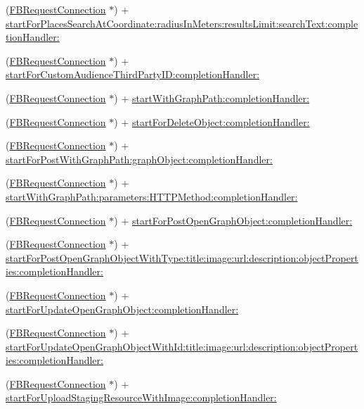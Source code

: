 \begin{DoxyCompactItemize}
\item 
(\hyperlink{interfaceFBRequestConnection}{F\+B\+Request\+Connection} $\ast$) + \hyperlink{interfaceFBRequestConnection_abc6f5878bcfabf0b419347a4cbfb2f68}{start\+For\+Places\+Search\+At\+Coordinate\+:radius\+In\+Meters\+:results\+Limit\+:search\+Text\+:completion\+Handler\+:}
\item 
(\hyperlink{interfaceFBRequestConnection}{F\+B\+Request\+Connection} $\ast$) + \hyperlink{interfaceFBRequestConnection_ab2ed1b7d417b4c723b37512870a5add9}{start\+For\+Custom\+Audience\+Third\+Party\+I\+D\+:completion\+Handler\+:}
\item 
(\hyperlink{interfaceFBRequestConnection}{F\+B\+Request\+Connection} $\ast$) + \hyperlink{interfaceFBRequestConnection_ad5b57e64c614dcb04a71e62ee11a87d5}{start\+With\+Graph\+Path\+:completion\+Handler\+:}
\item 
(\hyperlink{interfaceFBRequestConnection}{F\+B\+Request\+Connection} $\ast$) + \hyperlink{interfaceFBRequestConnection_a3fc3ae420d8e47fd0b7a6b915622c527}{start\+For\+Delete\+Object\+:completion\+Handler\+:}
\item 
(\hyperlink{interfaceFBRequestConnection}{F\+B\+Request\+Connection} $\ast$) + \hyperlink{interfaceFBRequestConnection_ac79fe3711cf5a9dd8a9dde04638ca255}{start\+For\+Post\+With\+Graph\+Path\+:graph\+Object\+:completion\+Handler\+:}
\item 
(\hyperlink{interfaceFBRequestConnection}{F\+B\+Request\+Connection} $\ast$) + \hyperlink{interfaceFBRequestConnection_aff0e9852584fcd2c81eb7f4751ef0ee2}{start\+With\+Graph\+Path\+:parameters\+:\+H\+T\+T\+P\+Method\+:completion\+Handler\+:}
\item 
(\hyperlink{interfaceFBRequestConnection}{F\+B\+Request\+Connection} $\ast$) + \hyperlink{interfaceFBRequestConnection_aa592bef80bf5a2450be91fc9538b65bd}{start\+For\+Post\+Open\+Graph\+Object\+:completion\+Handler\+:}
\item 
(\hyperlink{interfaceFBRequestConnection}{F\+B\+Request\+Connection} $\ast$) + \hyperlink{interfaceFBRequestConnection_a98c88d095d77cc16d000fb9ce51d39e1}{start\+For\+Post\+Open\+Graph\+Object\+With\+Type\+:title\+:image\+:url\+:description\+:object\+Properties\+:completion\+Handler\+:}
\item 
(\hyperlink{interfaceFBRequestConnection}{F\+B\+Request\+Connection} $\ast$) + \hyperlink{interfaceFBRequestConnection_a481c4621f12410a7f6bbc7a0ccd6890b}{start\+For\+Update\+Open\+Graph\+Object\+:completion\+Handler\+:}
\item 
(\hyperlink{interfaceFBRequestConnection}{F\+B\+Request\+Connection} $\ast$) + \hyperlink{interfaceFBRequestConnection_ab5cf9ca8b5ab176a3d46fdf8db08ddf8}{start\+For\+Update\+Open\+Graph\+Object\+With\+Id\+:title\+:image\+:url\+:description\+:object\+Properties\+:completion\+Handler\+:}
\item 
(\hyperlink{interfaceFBRequestConnection}{F\+B\+Request\+Connection} $\ast$) + \hyperlink{interfaceFBRequestConnection_a930bc2fc6bfff73c3d98d15e6c84a5f9}{start\+For\+Upload\+Staging\+Resource\+With\+Image\+:completion\+Handler\+:}
\end{DoxyCompactItemize}
